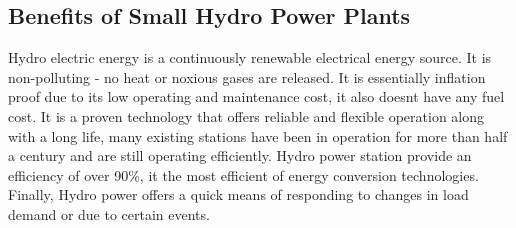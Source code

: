 \subsection{Benefits of Small Hydro Power Plants}

Hydro electric energy is a continuously renewable electrical energy source. It is non-polluting - no heat or noxious gases are released. It is essentially inflation proof due to its low operating and maintenance cost, it also doesnt have any fuel cost. It is a proven technology that offers reliable and flexible operation along with a long life, many existing stations have been in operation for more than half a century and are still operating efficiently.
Hydro power station provide an efficiency of over 90\%, it the most efficient of energy conversion technologies. Finally, Hydro power offers a quick means of responding to changes in load demand or due to certain events.

